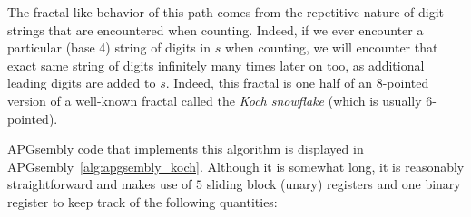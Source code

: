 The fractal-like behavior of this path comes from the repetitive nature of digit strings that are encountered when counting. Indeed, if we ever encounter a particular (base 4) string of digits in $s$ when counting, we will encounter that exact same string of digits infinitely many times later on too, as additional leading digits are added to $s$. Indeed, this fractal is one half of an $8$-pointed version of a well-known fractal called the \emph{Koch snowflake} (which is usually $6$-pointed).

APGsembly code that implements this algorithm is displayed in APGsembly~\ref{alg:apgsembly_koch}. Although it is somewhat long, it is reasonably straightforward and makes use of $5$ sliding block (unary) registers and one binary register to keep track of the following quantities:\medskip

